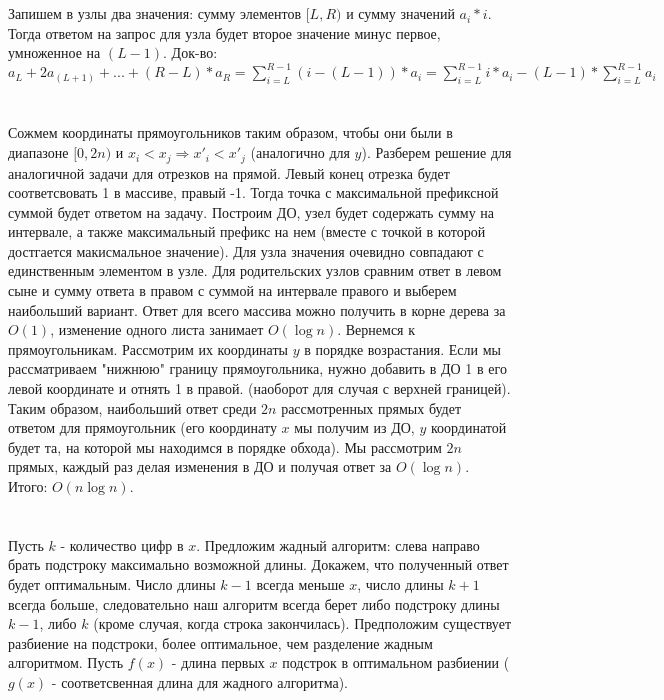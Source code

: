 \documentclass{article}
\begin{document}
\begin{flushleft}

\section{}
Запишем в узлы два значения: сумму элементов $[L, R)$ и сумму значений $a_i * i$. Тогда ответом на запрос для узла будет второе значение минус первое, умноженное на $(L - 1)$. Док-во: $a_L + 2a_{(L+1)} + ... + (R - L) * a_R = \sum\limits_{i = L}^{R - 1}{(i - (L - 1)) * a_i} = \sum\limits_{i = L}^{R - 1}{i * a_i} - (L - 1) * \sum\limits_{i = L}^{R - 1}{a_i}$

\section{}

Сожмем координаты прямоугольников таким образом, чтобы они были в диапазоне $[0, 2n)$ и $x_i < x_j \Rightarrow x'_i < x'_j$ (аналогично для $y$). Разберем решение для аналогичной задачи для отрезков на прямой. Левый конец отрезка будет соответсвовать 1 в массиве, правый -1. Тогда точка с максимальной префиксной суммой будет ответом на задачу. Построим ДО, узел будет содержать сумму на интервале, а также максимальный префикс на нем (вместе с точкой в которой достгается макисмальное значение). Для узла значения очевидно совпадают с единственным элементом в узле. Для родительских узлов сравним ответ в левом сыне и сумму ответа в правом с суммой на интервале правого и выберем наибольший вариант. Ответ для всего массива можно получить в корне дерева за $O(1)$, изменение одного листа занимает  $O(\log{n})$. Вернемся к прямоугольникам. Рассмотрим их координаты $y$ в порядке возрастания. Если мы рассматриваем "нижнюю" границу прямоугольника, нужно добавить в ДО 1 в его левой координате и отнять 1 в правой. (наоборот для случая с верхней границей). Таким образом, наибольший ответ среди $2n$ рассмотренных прямых будет ответом для прямоугольник (его координату $x$ мы получим из ДО, $y$ координатой будет та, на которой мы находимся в порядке обхода). Мы рассмотрим $2n$ прямых, каждый раз делая изменения в ДО и получая ответ за $O(\log{n})$. Итого: $O(n\log{n})$.

\section{}
Пусть $k$ - количество цифр в $x$. Предложим жадный алгоритм: слева направо брать подстроку максимально возможной длины. Докажем, что полученный ответ будет оптимальным. Число длины $k - 1$ всегда меньше $x$, число длины $k + 1$ всегда больше, следовательно наш алгоритм всегда берет либо подстроку длины $k - 1$, либо $k$ (кроме случая, когда строка закончилась). Предположим существует разбиение на подстроки, более оптимальное, чем разделение жадным алгоритмом. Пусть $f(x)$ - длина первых $x$ подстрок в оптимальном разбиении ($g(x)$ - соответсвенная длина для жадного алгоритма). 


\end{flushleft}
\end{document}
